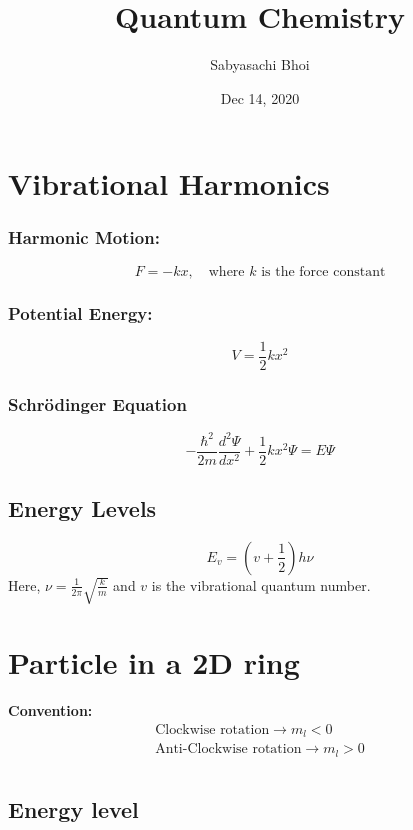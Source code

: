 \documentclass[12pt]{article}
\theoremstyle{definition}
\theoremstyle{definition}
\begin{document}
\title{Quantum Chemistry}
\author{Sabyasachi Bhoi}
\date{Dec 14, 2020}
\maketitle

\section{Vibrational Harmonics}

\subsubsection*{Harmonic Motion:} 

\[
	F = -kx, \quad \textrm{where $k$ is the force constant}
\]

\subsubsection*{Potential Energy:} 
\[
	V = \frac{1}{2} kx^2
\]

\subsubsection*{Schr\"odinger Equation}
\[
	- \frac{\hbar^2}{2m} \frac{d^2\Psi}{d x^2} + \frac{1}{2} kx^2\Psi = E\Psi
\]

\subsection{Energy Levels}

\[
	E_v = \left( v + \frac{1}{2} \right) h\nu
\]
Here, $\nu = \frac{1}{2\pi} \sqrt{\frac{k}{m}}$ and $v$ is the vibrational quantum number.

\section{Particle in a 2D ring}

\textbf{Convention:}
\begin{align*}
	\textrm{Clockwise rotation} \rightarrow m_l < 0\\
	\textrm{Anti-Clockwise rotation} \rightarrow m_l > 0\\
\end{align*}

\subsection{Energy level}
\end{document}
